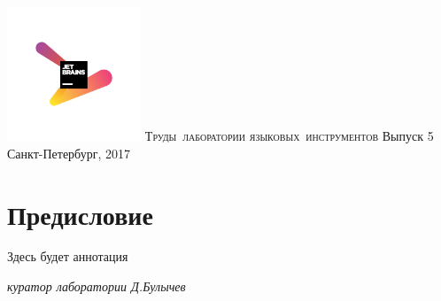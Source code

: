 \documentclass[runningheads]{jblab}
\begin{document}
\newcommand{\Issue}[0]{5}
\newcommand{\Year}[0]{2017}

\newcommand \bnfdef  {\mathrel{::=}}
\newcommand \bnfalt  {\mathrel{{|}}}
\newcommand \lpar  {\mathrel{{[}}}
\newcommand \rpar  {\mathrel{{]}}}
\newcommand \llpar  {\mathrel{{\llbracket}}}
\newcommand \rrpar  {\mathrel{{\rrbracket}}}


\sloppy

\begin{titlepage}

\centering

\includegraphics[width=4cm]{logo_JetBrains_1.png}
\vskip 1mm
\mbox{\Large{\textsc{Труды лаборатории}}}
\vskip 0.5cm
\mbox{\Large{\textsc{языковых инструментов}}}
\vskip 2.5cm
\large{Выпуск \Issue}
\vskip 6cm
\large{Санкт-Петербург, \Year}
\end{titlepage}

\thispagestyle{empty}
\phantom{xx}
\pagebreak

\chapter*{Предисловие}

Здесь будет аннотация

\vskip 2cm
\begin{flushright}
\textit{куратор лаборатории Д.Булычев}
\end{flushright}

{
\tableofcontents
\thispagestyle{plain}
}








\end{document}
